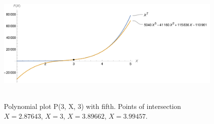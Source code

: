 ﻿\begin{figure}[H]
    \centering
    \includegraphics[width=1\textwidth]{sections/images/05_plots_polynomial_p3_n3_with_seventh}
    ~\caption{Polynomial plot P(3, X, 3) with fifth.
    Points of intersection $X=2.87643$, $X=3$, $X=3.89662$, $X=3.99457$.}\label{fig:figure11}
\end{figure}
